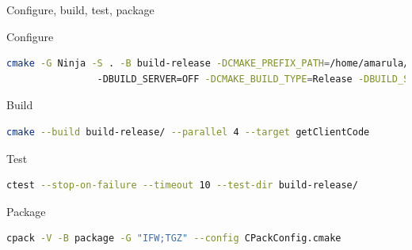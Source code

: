 \documentclass{beamer}
\begin{document}
\begin{frame}[fragile]{Configure, build, test, package}\footnotesize%
	\vspace{1.0cm}
	\begin{block}{\footnotesize Configure}
			\begin{lstlisting}[language=sh]
				cmake -G Ninja -S . -B build-release -DCMAKE_PREFIX_PATH=/home/amarula/Qt/6.8.0/gcc_64/
				-DBUILD_SERVER=OFF -DCMAKE_BUILD_TYPE=Release -DBUILD_SHARED_LIBS=ON
			\end{lstlisting}
	\end{block}
	\begin{block}{\footnotesize Build}
			\begin{lstlisting}[language=sh]
				cmake --build build-release/ --parallel 4 --target getClientCode
			\end{lstlisting}
	\end{block}
	\begin{block}{\footnotesize Test}
			\begin{lstlisting}[language=sh]
				ctest --stop-on-failure --timeout 10 --test-dir build-release/
			\end{lstlisting}
	\end{block}
	\begin{block}{\footnotesize Package}
			\begin{lstlisting}[language=sh]
				cpack -V -B package -G "IFW;TGZ" --config CPackConfig.cmake
			\end{lstlisting}
	\end{block}
\end{frame}
\end{document}
